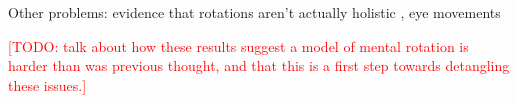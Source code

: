 \documentclass[10pt,letterpaper]{article}
\newcommand{\TODO}[1]{\textcolor{red}{[TODO: #1]}}
\begin{document}
Other problems: evidence that rotations aren't actually holistic
\cite{Yuille:1982tx}, eye movements \cite{Just1976}

\TODO{talk about how these results suggest a model of mental rotation
  is harder than was previous thought, and that this is a first step
  towards detangling these issues.}




\renewcommand{\bibliographytypesize}{\small}
\setlength{\bibleftmargin}{.125in}
\setlength{\bibindent}{-\bibleftmargin}

\end{document}
